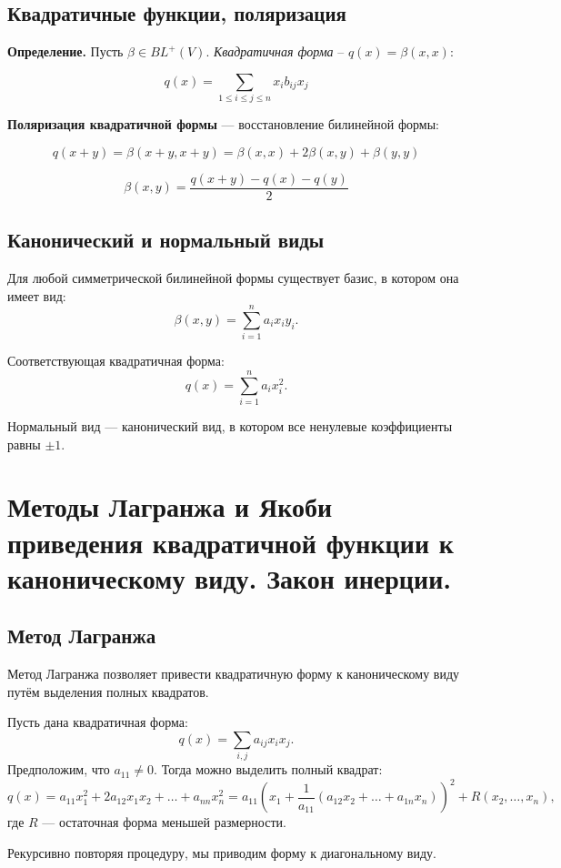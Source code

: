 \documentclass[12pt]{article}
\begin{document}
\subsection{Квадратичные функции, поляризация}

\textbf{Определение.} Пусть $\beta \in BL^+(V).$ \textit{Квадратичная форма} – $q(x)=\beta(x,x)$:

$$
q(x) =\sum_{1 \leq i \leq j \leq n}{x_i b_{ij}x_j}
$$

\textbf{Поляризация квадратичной формы} — восстановление билинейной формы:

$$
q(x + y) = \beta(x + y, x + y)
         = \beta(x, x) + 2\beta(x, y) + \beta(y, y)
$$

$$
\beta(x, y) = \frac{q(x + y) - q(x) - q(y)}{2}
$$

\subsection{Канонический и нормальный виды}

Для любой симметрической билинейной формы существует базис, в котором она имеет вид:
$$
\beta(x, y) = \sum_{i=1}^n a_i x_i y_i.
$$

Соответствующая квадратичная форма:
$$
q(x) = \sum_{i=1}^n a_i x_i^2.
$$

Нормальный вид — канонический вид, в котором все ненулевые коэффициенты равны $\pm 1$.

\section{Методы Лагранжа и Якоби приведения квадратичной функции к каноническому виду. Закон инерции.}

\subsection{Метод Лагранжа}

Метод Лагранжа позволяет привести квадратичную форму к каноническому виду путём выделения полных квадратов.

Пусть дана квадратичная форма:
\[
q(x) = \sum_{i,j} a_{ij} x_i x_j.
\]
Предположим, что $a_{11} \ne 0$. Тогда можно выделить полный квадрат:
\[
q(x) = a_{11}x_1^2 + 2a_{12}x_1x_2 + \dots + a_{nn}x_n^2 = 
a_{11}\left(x_1 + \frac{1}{a_{11}}(a_{12}x_2 + \dots + a_{1n}x_n)\right)^2 + R(x_2, \dots, x_n),
\]
где $R$ — остаточная форма меньшей размерности.

Рекурсивно повторяя процедуру, мы приводим форму к диагональному виду.
\end{document}
